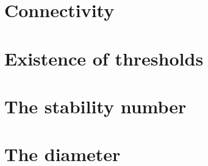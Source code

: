 \section{Connectivity}
\section{Existence of thresholds}
\section{The stability number}
\section{The diameter}